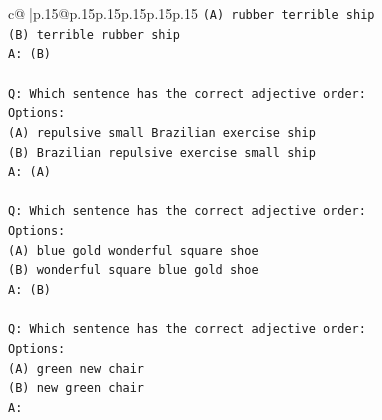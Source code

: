 \documentclass{article}
\begin{document}
{\begin{supertabular}{c@{$\;$}|p{.15\linewidth}@{}p{.15\linewidth}p{.15\linewidth}p{.15\linewidth}p{.15\linewidth}p{.15\linewidth}}
{{{\texttt{(A) rubber terrible ship} \\
\texttt{(B) terrible rubber ship} \\
\texttt{A: (B)} \\
\\ 
\texttt{Q: Which sentence has the correct adjective order:} \\
\texttt{Options:} \\
\texttt{(A) repulsive small Brazilian exercise ship} \\
\texttt{(B) Brazilian repulsive exercise small ship} \\
\texttt{A: (A)} \\
\\ 
\texttt{Q: Which sentence has the correct adjective order:} \\
\texttt{Options:} \\
\texttt{(A) blue gold wonderful square shoe} \\
\texttt{(B) wonderful square blue gold shoe} \\
\texttt{A: (B)} \\
\\ 
\texttt{Q: Which sentence has the correct adjective order:} \\
\texttt{Options:} \\
\texttt{(A) green new chair} \\
\texttt{(B) new green chair} \\
\texttt{A:} \\
            }
        }
    }
     \\ \\


\end{supertabular}}
\end{document}
